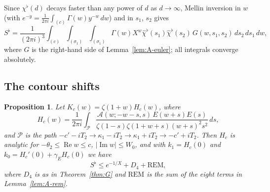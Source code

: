 \documentclass[11pt]{amsart}
\numberwithin{equation}{section}
\newtheorem{proposition}[theorem]{Proposition}
\theoremstyle{definition}
\theoremstyle{remark}
\newcommand{\Rp}{\operatorname{Re}}
\newcommand{\Ip}{\operatorname{Im}}
\begin{document}
Since $\chi^\flat(d)$ decays faster than any power of $d$ as $d \to \infty$, Mellin inversion in $w$ (with $e^{-y} = \frac1{2\pi i}\int_{(c)}\Gamma(w)y^{-w}\,dw$) and in $s_1$, $s_2$ gives
\begin{equation}\label{eq:triple}
S^\flat = \frac1{(2\pi i)^3}\int_{(c)}\int_{(\sigma_1)}\int_{(\sigma_1)}\Gamma(w)X^w\hat\chi^\flat(s_1)\hat\chi^\flat(s_2)\,G(w, s_1, s_2)\,ds_2\,ds_1\,dw,
\end{equation}
where $G$ is the right-hand side of Lemma~\ref{lem:A-euler}; all integrals converge absolutely.

\subsection{The contour shifts}

\begin{proposition}\label{prop:A-main}
Let $K_c(w) = \zeta(1 + w)H_c(w)$, where
\[
H_c(w) = \frac1{2\pi i}\int_{\mathcal P}\frac{\mathcal A(w; -w-s, s)\,E(w + s)E(s)}{\zeta(1 - s)\zeta(1 + w + s)(w + s)^2s^2}\,ds,
\]
and $\mathcal P$ is the path $-c' - iT_2 \to \kappa_1 - iT_2 \to \kappa_1 + iT_2 \to -c' + iT_2$.
Then $H_c$ is analytic for $-\theta_2 \leq \Rp w \leq c$, $|\Ip w| \leq W_0$, and with $k_1 = H_c(0)$ and $k_0 = H_c'(0) + \gamma_EH_c(0)$ we have
\[
S^\flat \leq e^{-1/X} + D_4 + \mathrm{REM},
\]
where $D_4$ is as in Theorem~\ref{thm:G} and $\mathrm{REM}$ is the sum of the eight terms in Lemma~\ref{lem:A-rem}.
\end{proposition}
\end{document}

